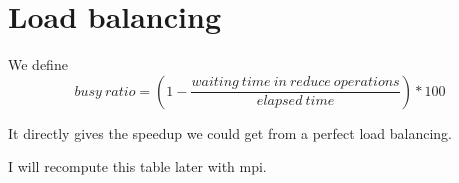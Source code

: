 \documentclass[a4paper]{article}
\begin{document}
\section{Load balancing}

We define
$$busy\ ratio = (1 - \frac{waiting\ time\ in\ reduce\ operations}{elapsed\ time}) * 100$$

It directly gives the speedup we could get from a perfect load balancing.\newline

I will recompute this table later with mpi.




\end{document}
